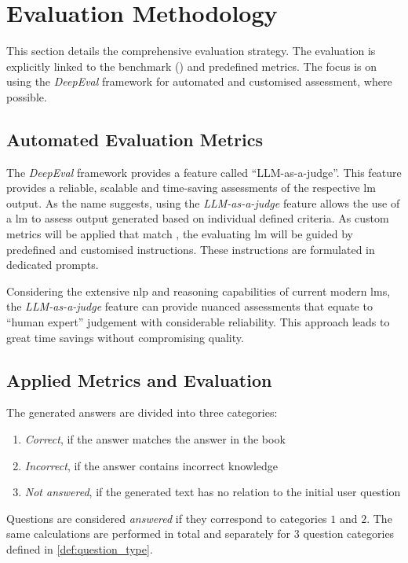 \section{Evaluation Methodology}\label{sec:evaluation_methodology_approach}

This section details the comprehensive evaluation strategy.
The evaluation is explicitly linked to the benchmark (\citet{Paul_Keller}) and predefined metrics. 
The focus is on using the \textit{DeepEval} framework for automated and customised assessment, where possible.
%
\subsection{Automated Evaluation Metrics}\label{subsec:auto_eval_approach}

The \textit{DeepEval} framework provides a feature called \enquote{LLM-as-a-judge}.
This feature provides a reliable, scalable and time-saving assessments of the respective \ac{lm} output. 
As the name suggests, using the \textit{LLM-as-a-judge} feature allows the use of a \ac{lm} to assess output generated based on individual defined criteria.
As custom metrics will be applied that match \citet{Paul_Keller}, the evaluating \ac{lm} will be guided by predefined and customised instructions.
These instructions are formulated in dedicated prompts.

Considering the extensive \ac{nlp} and reasoning capabilities of current modern \acp{lm}, the \textit{LLM-as-a-judge} feature can provide nuanced assessments that equate to \enquote{human expert} judgement with considerable reliability.
This approach leads to great time savings without compromising quality.
%
\subsection{Applied Metrics and Evaluation}\label{sub:metrics_eval_approach}
The generated answers are divided into three categories:
%
\begin{enumerate}
    \item \textit{Correct}, if the answer matches the answer in the book 
    \item \textit{Incorrect}, if the answer contains incorrect knowledge
    \item \textit{Not answered}, if the generated text has no relation to the initial user question
\end{enumerate}
% 
Questions are considered \textit{answered} if they correspond to categories $1$ and $2$.
The same calculations are performed in total and separately for $3$ question categories defined in \cref{def:question_type}.
%

